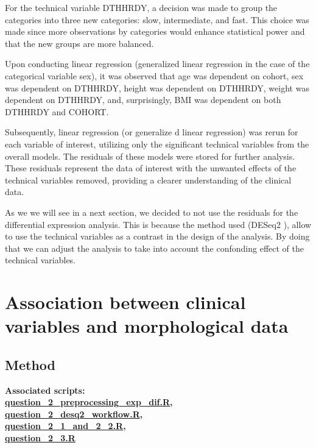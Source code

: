 \documentclass[a4paper, 11pt]{article}
\begin{document}
\begin{multicols}{2}
For the technical variable DTHHRDY, a decision was made to group the categories into three new categories: slow, intermediate, and fast.
This choice was made since more observations by categories would enhance statistical power and that the new groups are more balanced.

Upon conducting linear regression (generalized linear regression in the case of the categorical variable sex), it was observed that age was dependent on cohort, sex was dependent on DTHHRDY, height was dependent on DTHHRDY, weight was dependent on DTHHRDY, and, surprisingly, BMI was dependent on both DTHHRDY and COHORT.

Subsequently, linear regression (or generalize d linear regression) was rerun for each variable of interest, utilizing only the significant technical variables from the overall models.
The residuals of these models were stored for further analysis.
These residuals represent the data of interest with the unwanted effects of the technical variables removed, providing a clearer understanding of the clinical data.

As we we will see in a next section, we decided to not use the residuals for the differential expression analysis. This is because the method used (DESeq2 \citep{DESeq2:2014}), allow to use the technical variables as a contrast in the design of the analysis. By doing that we can adjust the analysis to take into account the confonding effect of the technical variables.

\section{Association between clinical variables and morphological data}
\subsection*{Method}
\begin{scriptsize}
	\textbf{Associated scripts:\\
	\href{https://github.com/leopoldguyot/BINF-F401-Project/blob/main/question_2_preprocessing_exp_dif.R}{question\_2\_preprocessing\_exp\_dif.R},\\
	\href{https://github.com/leopoldguyot/BINF-F401-Project/blob/main/question_2_desq2_workflow.R}{question\_2\_desq2\_workflow.R},\\
	\href{https://github.com/leopoldguyot/BINF-F401-Project/blob/main/question_2_1_and_2_2.R}{question\_2\_1\_and\_2\_2.R},\\
	\href{https://github.com/leopoldguyot/BINF-F401-Project/blob/main/question_2_3.R}{question\_2\_3.R}
	}
\end{scriptsize}


\end{multicols}
\end{document}
